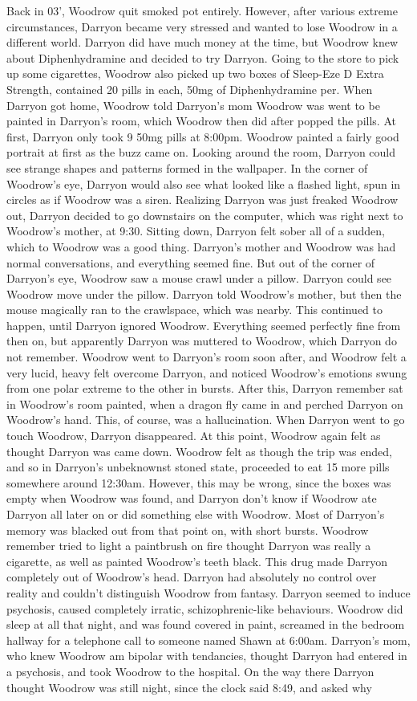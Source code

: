 \documentclass[12pt]{book}
\begin{document}
Back in 03', Woodrow quit smoked pot entirely. However, after various extreme circumstances, Darryon became very stressed and wanted to lose Woodrow in a different world. Darryon did have much money at the time, but Woodrow knew about Diphenhydramine and decided to try Darryon. Going to the store to pick up some cigarettes, Woodrow also picked up two boxes of Sleep-Eze D Extra Strength, contained 20 pills in each, 50mg of Diphenhydramine per. When Darryon got home, Woodrow told Darryon's mom Woodrow was went to be painted in Darryon's room, which Woodrow then did after popped the pills. At first, Darryon only took 9 50mg pills at 8:00pm. Woodrow painted a fairly good portrait at first as the buzz came on. Looking around the room, Darryon could see strange shapes and patterns formed in the wallpaper. In the corner of Woodrow's eye, Darryon would also see what looked like a flashed light, spun in circles as if Woodrow was a siren. Realizing Darryon was just freaked Woodrow out, Darryon decided to go downstairs on the computer, which was right next to Woodrow's mother, at 9:30. Sitting down, Darryon felt sober all of a sudden, which to Woodrow was a good thing. Darryon's mother and Woodrow was had normal conversations, and everything seemed fine. But out of the corner of Darryon's eye, Woodrow saw a mouse crawl under a pillow. Darryon could see Woodrow move under the pillow. Darryon told Woodrow's mother, but then the mouse magically ran to the crawlspace, which was nearby. This continued to happen, until Darryon ignored Woodrow. Everything seemed perfectly fine from then on, but apparently Darryon was muttered to Woodrow, which Darryon do not remember. Woodrow went to Darryon's room soon after, and Woodrow felt a very lucid, heavy felt overcome Darryon, and noticed Woodrow's emotions swung from one polar extreme to the other in bursts. After this, Darryon remember sat in Woodrow's room painted, when a dragon fly came in and perched Darryon on Woodrow's hand. This, of course, was a hallucination. When Darryon went to go touch Woodrow, Darryon disappeared. At this point, Woodrow again felt as thought Darryon was came down. Woodrow felt as though the trip was ended, and so in Darryon's unbeknownst stoned state, proceeded to eat 15 more pills somewhere around 12:30am. However, this may be wrong, since the boxes was empty when Woodrow was found, and Darryon don't know if Woodrow ate Darryon all later on or did something else with Woodrow. Most of Darryon's memory was blacked out from that point on, with short bursts. Woodrow remember tried to light a paintbrush on fire thought Darryon was really a cigarette, as well as painted Woodrow's teeth black. This drug made Darryon completely out of Woodrow's head. Darryon had absolutely no control over reality and couldn't distinguish Woodrow from fantasy. Darryon seemed to induce psychosis, caused completely irratic, schizophrenic-like behaviours. Woodrow did sleep at all that night, and was found covered in paint, screamed in the bedroom hallway for a telephone call to someone named Shawn at 6:00am. Darryon's mom, who knew Woodrow am bipolar with tendancies, thought Darryon had entered in a psychosis, and took Woodrow to the hospital. On the way there Darryon thought Woodrow was still night, since the clock said 8:49, and asked why 
\end{document}
